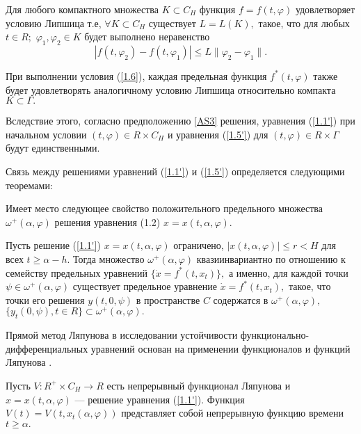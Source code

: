 	\begin{definition}\label{AS3} Для любого компактного множества $K\subset C_H$
		функция $f=f(t,\varphi )$ удовлетворяет условию Липшица т.е, $\forall K\subset C_H$ существует $L=L(K),$ такое, что  для любых
		$t\in R;$ $\varphi _1, \varphi _2\in K$ будет выполнено неравенство
		\begin{equation}
		|f(t,\varphi _2)-f(t,\varphi _1)|\le L\|\varphi _2-\varphi _1\|.
		\label{1.6}
		\end{equation}
	\end{definition}
	
	При выполнении условия (\ref{1.6}), каждая
	предельная функция $f^*(t,\varphi )$ также будет удовлетворять
	аналогичному условию Липшица относительно компакта
	$K\subset\Gamma.$
	
	Вследствие этого, согласно предположению  \ref{AS3}
	решения,
	уравнения (\ref{1.1'}) при начальном условии $(t,\varphi )\in R 
	\times C_H$ и уравнения (\ref{1.5'}) для $(t,\varphi )\in R
	\times\Gamma $ будут единственными.
	
	Связь между решениями уравнений  (\ref{1.1'})  и  (\ref{1.5'})
	определяется следующими теоремами:
	
	Имеет место следующее свойство положительного предельного множества $\omega^{+} (\alpha, \varphi)$ решения уравнения (1.2) $x = x(t, \alpha, \varphi).$
	
	\begin{theorem}\label{t-1.2}  Пусть  решение  (\ref{1.1'}) $x=x(t,\alpha ,\varphi )$
		ограничено, $|x(t,\alpha ,\varphi)|\le r<H$ для всех $t\ge \alpha
		-h.$ Тогда множество $\omega ^+(\alpha ,\varphi )$
		квазиинвариантно по отношению к семейству предельных уравнений
		$\{\dot x=f^*(t,x_t)\},$ а именно,  для  каждой точки $\psi\in\omega
		^+(\alpha ,\varphi )$ существует предельное уравнение $\dot
		x=f^*(t,x_t),$ такое, что точки его решения
		$y(t,0,\psi )$ в пространстве $C$ содержатся в $\omega^+(\alpha,\varphi ),$
		$\{ y_t(0,\psi ), t\in R\}\subset\omega ^+(\alpha ,\varphi ).$
	\end{theorem}
	
	Прямой метод Ляпунова в исследовании устойчивости функ\-ци\-о\-наль\-но-диф\-фе\-рен\-ци\-аль\-ных
	уравнений основан на применении функционалов и функций Ляпунова \cite{}.
	
	Пусть $V:R^+\times C_H\to R$ есть непрерывный функционал Ляпунова и
	$x=x(t,\alpha ,\varphi )$ ---
	решение уравнения (\ref{1.1'}). Функция $V(t)=V(t,x_t(\alpha
	,\varphi ))$ представляет собой непрерывную функцию времени
	$t\ge\alpha.$
	
